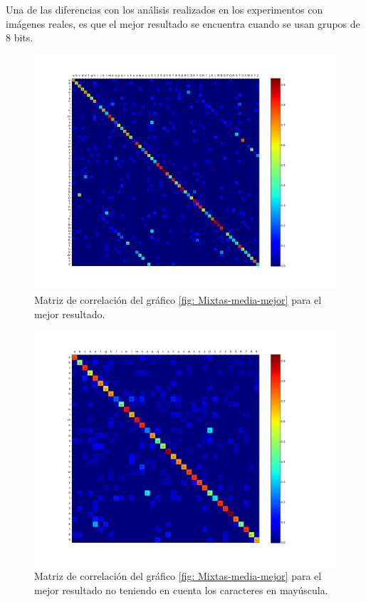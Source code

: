 	Una de las diferencias con los análisis realizados en los experimentos con imágenes reales, es que el mejor resultado se encuentra cuando se usan grupos de $8$ bits. 


			\begin{figure}[!htbp]
				\centerline{\includegraphics[scale=0.4]{img/resultados/mixtas/best_mean_matrix_Alpha0,01_4080-8.png}}
				\caption[Mixtas Matriz expon]{Matriz de correlación del gráfico \ref{fig: Mixtas-media-mejor} para el mejor resultado. }
				\label{fig: Mixtas-Matrix-media-mejor}
			\end{figure}
	
			\begin{figure}[!htbp]
				\centerline{\includegraphics[scale=0.4]{img/resultados/mixtas/best_mean_matrix_Alpha0,01_4080-8_ins.png}}
				\caption[Matriz de correlación ``case insensitive'' para mixtas media]{Matriz de correlación del gráfico \ref{fig: Mixtas-media-mejor} para el mejor resultado no teniendo en cuenta los caracteres en mayúscula.}
				\label{fig: MatrizIns-Mixtas-media-mejor}
			\end{figure}

